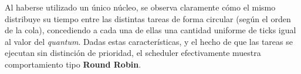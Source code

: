 Al haberse utilizado un único núcleo, se observa claramente cómo el mismo distribuye su tiempo entre las distintas tareas de forma circular (según el orden de la cola), concediendo a cada una de ellas una cantidad uniforme de ticks igual al valor del \textit{quantum}. Dadas estas características, y el hecho de que las tareas se ejecutan sin distinción de prioridad, el scheduler efectivamente muestra comportamiento tipo \textbf{Round Robin}.